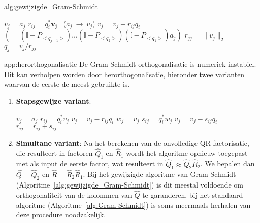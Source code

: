 \begin{alg}{alg:gewijzigde_Gram-Schmidt}
    \vspace{-0.3cm}
    \begin{tcolorbox}[colback=white, colframe=gray, arc=0mm] 
        \begin{algorithmic}[1]
            \State $v_j = a_j$
                \State $r_{ij} = q_i^* \boldsymbol{v_j}$ \ ($a_j \ \rightarrow \ v_j$)
                \State $v_j = v_j - r_{ij} q_i$ \ $(= (\mathbb{I} - P_{<q_{j - 1}>})\ldots(\mathbb{I} - P_{<q_{2}>})(\mathbb{I} - P_{<q_{1}>})a_j)$
            \EndFor
            \State $r_{jj} = \|v_j\|_2$
            \State $q_j = v_j / r_{jj}$
        \EndFor
        \end{algorithmic}
    \end{tcolorbox}
    \vspace{-0.3cm}
\end{alg}

\begin{app}{app:herorthogonalisatie}
    De Gram-Schmidt orthogonalisatie is numeriek instabiel. Dit kan verholpen worden door herorthogonalisatie, hieronder twee varianten waarvan de eerste de meest gebruikte is.
    \begin{enumerate}
        \item \textbf{Stapsgewijze variant}:    
            \begin{tcolorbox}[colback=white, colframe=gray, arc=0mm] 
                \begin{algorithmic}[1]
                \State $v_j = a_j$
                    \State $r_{ij} = q_i^* v_j$
                    \State $v_j = v_j - r_{ij} q_i$
                \EndFor
                \State
                \State $w_j = v_j$
                    \State $s_{ij} = q_i^* w_j$
                    \State $v_j = v_j - s_{ij} q_i$
                    \State $r_{ij} = r_{ij} + s_{ij}$
                \EndFor
                \end{algorithmic}
            \end{tcolorbox}
        \item \textbf{Simultane variant}: Na het berekenen van de onvolledige QR-factorisatie, die resulteert in factoren $\hat{Q}_1$ en $\hat{R}_1$ wordt het algoritme opnieuw toegepast met als input de eerste factor, wat resulteert in $\hat{Q}_1 \approx \hat{Q}_2\hat{R}_2$. We bepalen dan $\hat{Q} = \hat{Q}_2$ en $\hat{R} = \hat{R}_2\hat{R}_1$. Bij het gewijzigde algoritme van Gram-Schmidt (Algoritme~\ref{alg:gewijzigde_Gram-Schmidt}) is dit meestal voldoende om orthogonaliteit van de kolommen van $\hat{Q}$ te garanderen, bij het standaard algoritme (Algoritme~\ref{alg:Gram-Schmidt}) is soms meermaals herhalen van deze procedure noodzakelijk.
    \end{enumerate}
\end{app}

